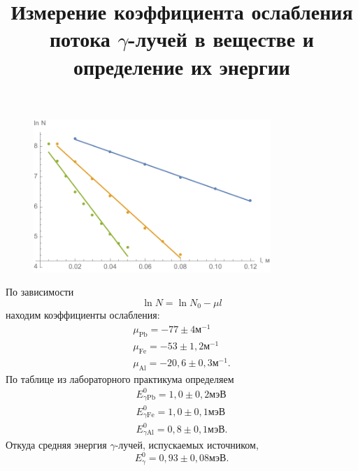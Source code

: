 \documentclass[a4paper]{article}
\title{Измерение коэффициента ослабления потока
$\gamma$-лучей в веществе и определение их энергии}
\begin{document}
	\maketitle
\begin{figure}[htpb]
	\centering
	\includegraphics[width=0.8\textwidth]{Untitled}
	\caption{}
	\label{fig:Untitled}
\end{figure}
По зависимости
\[
\ln N=\ln N_0 -\mu l
\] находим коэффициенты ослабления:
\begin{gather*}
\mu_\text{Pb}=-77\pm 4 \text{м}^{-1}\\
\mu_{\text{Fe}}=-53\pm 1,2 \text{м}^{-1}\\
\mu_{\text{Al}}=-20,6 \pm 0,3 \text{м}^{-1}
.\end{gather*} 
По таблице из лабораторного практикума определяем
\begin{gather*}
	E_{\gamma\text{Pb}}^0=1,0 \pm 0,2 \text{мэВ}\\
	E_{\gamma\text{Fe}}^0= 1,0 \pm 0,1 \text{мэВ}\\
	E_{\gamma\text{Al}}^0=0,8 \pm 0,1 \text{мэВ}
.\end{gather*}
Откуда средняя энергия $\gamma$-лучей, испускаемых источником,
\[
E_\gamma^0=0,93 \pm 0,08 \text{мэВ}
.\] 
\end{document}
